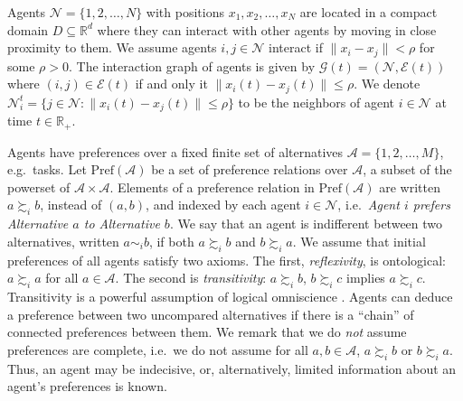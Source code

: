 \documentclass[conference]{ieeeconf}
\newcommand{\R}{\mathbb{R}}
\newcommand{\N}{\mathcal{N}}
\newcommand{\A}{\mathcal{A}}
\newcommand{\Pref}{\mathrm{Pref}}
\newcommand{\prefers}{\succsim}
\newcommand{\indif}{\sim}
\renewcommand{\leq}{\leqslant}
\newcommand{\graph}{\mathcal{G}}
\newcommand{\edges}{\mathcal{E}}
\begin{document}
Agents $\N = \{1,2,\dots, N\}$ with positions $x_1, x_2, \dots, x_N$ are located in a compact domain $D \subseteq \R^d$ where they can interact with other agents by moving in close proximity to them.
We assume agents $i, j \in \N$ interact if $\| x_i - x_j \| < \rho$ for some $\rho>0$. The interaction graph of agents is given by $\graph(t) = \left( \N, \edges(t) \right)$ where $(i,j) \in \mathcal{E}(t)$ if and only it $\| x_i(t) - x_j(t) \| \leq \rho$. We denote $\N_i^t = \{ j \in \N: \| x_i(t) - x_j(t) \| \leqslant \rho \}$ to be the neighbors of agent $i \in \N$ at time $t \in \R_{+}$.

Agents have preferences over a fixed finite set of alternatives $\A = \{1,2,\dots, M\}$, e.g.~tasks.  Let $\Pref(\A)$ be a set of preference relations over $\A$, a subset of the powerset of $\A \times \A$. Elements of a preference relation in $\Pref(\A)$ are written $a \prefers_i b$, instead of $(a,b)$, and indexed by each agent $i \in \N$, i.e.~\emph{Agent $i$ prefers Alternative $a$ to Alternative $b$}. We say that an agent is indifferent between two alternatives, written $a \indif_i b$, if both $a \prefers_i b$ and $b \prefers_i a$. We assume that initial preferences of all agents satisfy two axioms. The first, \emph{reflexivity}, is ontological: $a \prefers_i a$ for all $a \in \A$. The second is \emph{transitivity}: $a \prefers_i b$, $b \prefers_i c$ implies $a \prefers_i c$. Transitivity is a powerful assumption of logical omniscience \cite{fagin}. Agents can deduce a preference between two uncompared alternatives if there is a ``chain'' of connected preferences between them. We remark that we do \emph{not} assume preferences are complete, i.e.~we do not assume for all $a,b \in \A$, $a \prefers_i b$ or $b \prefers_i a$. Thus, an agent may be indecisive, or, alternatively, limited information about an agent's preferences is known.
\end{document}
